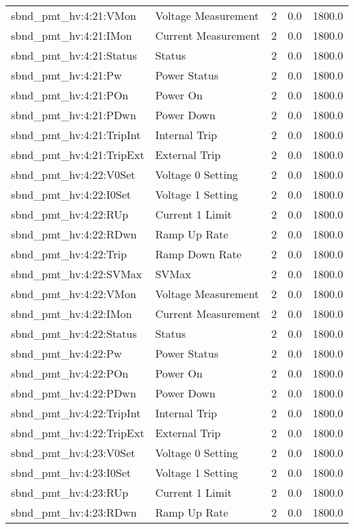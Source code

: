 \begin{center}
\begin{longtable}{l | l l l l }
sbnd\_pmt\_hv:4:21:VMon & Voltage Measurement & 2 & 0.0 & 1800.0\\ 
sbnd\_pmt\_hv:4:21:IMon & Current Measurement & 2 & 0.0 & 1800.0\\ 
sbnd\_pmt\_hv:4:21:Status & Status & 2 & 0.0 & 1800.0\\ 
sbnd\_pmt\_hv:4:21:Pw & Power Status & 2 & 0.0 & 1800.0\\ 
sbnd\_pmt\_hv:4:21:POn & Power On & 2 & 0.0 & 1800.0\\ 
sbnd\_pmt\_hv:4:21:PDwn & Power Down & 2 & 0.0 & 1800.0\\ 
sbnd\_pmt\_hv:4:21:TripInt & Internal Trip & 2 & 0.0 & 1800.0\\ 
sbnd\_pmt\_hv:4:21:TripExt & External Trip & 2 & 0.0 & 1800.0\\ 
sbnd\_pmt\_hv:4:22:V0Set & Voltage 0 Setting & 2 & 0.0 & 1800.0\\ 
sbnd\_pmt\_hv:4:22:I0Set & Voltage 1 Setting & 2 & 0.0 & 1800.0\\ 
sbnd\_pmt\_hv:4:22:RUp & Current 1 Limit & 2 & 0.0 & 1800.0\\ 
sbnd\_pmt\_hv:4:22:RDwn & Ramp Up Rate & 2 & 0.0 & 1800.0\\ 
sbnd\_pmt\_hv:4:22:Trip & Ramp Down Rate & 2 & 0.0 & 1800.0\\ 
sbnd\_pmt\_hv:4:22:SVMax & SVMax & 2 & 0.0 & 1800.0\\ 
sbnd\_pmt\_hv:4:22:VMon & Voltage Measurement & 2 & 0.0 & 1800.0\\ 
sbnd\_pmt\_hv:4:22:IMon & Current Measurement & 2 & 0.0 & 1800.0\\ 
sbnd\_pmt\_hv:4:22:Status & Status & 2 & 0.0 & 1800.0\\ 
sbnd\_pmt\_hv:4:22:Pw & Power Status & 2 & 0.0 & 1800.0\\ 
sbnd\_pmt\_hv:4:22:POn & Power On & 2 & 0.0 & 1800.0\\ 
sbnd\_pmt\_hv:4:22:PDwn & Power Down & 2 & 0.0 & 1800.0\\ 
sbnd\_pmt\_hv:4:22:TripInt & Internal Trip & 2 & 0.0 & 1800.0\\ 
sbnd\_pmt\_hv:4:22:TripExt & External Trip & 2 & 0.0 & 1800.0\\ 
sbnd\_pmt\_hv:4:23:V0Set & Voltage 0 Setting & 2 & 0.0 & 1800.0\\ 
sbnd\_pmt\_hv:4:23:I0Set & Voltage 1 Setting & 2 & 0.0 & 1800.0\\ 
sbnd\_pmt\_hv:4:23:RUp & Current 1 Limit & 2 & 0.0 & 1800.0\\ 
sbnd\_pmt\_hv:4:23:RDwn & Ramp Up Rate & 2 & 0.0 & 1800.0\\ 

\end{longtable}
\end{center}

